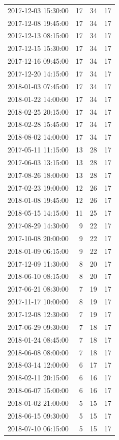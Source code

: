 \begin{tabular}{lrrr}
2017-12-03 15:30:00 & 17 & 34 & 17 \\
2017-12-08 19:45:00 & 17 & 34 & 17 \\
2017-12-13 08:15:00 & 17 & 34 & 17 \\
2017-12-15 15:30:00 & 17 & 34 & 17 \\
2017-12-16 09:45:00 & 17 & 34 & 17 \\
2017-12-20 14:15:00 & 17 & 34 & 17 \\
2018-01-03 07:45:00 & 17 & 34 & 17 \\
2018-01-22 14:00:00 & 17 & 34 & 17 \\
2018-02-25 20:15:00 & 17 & 34 & 17 \\
2018-02-28 15:45:00 & 17 & 34 & 17 \\
2018-08-02 14:00:00 & 17 & 34 & 17 \\
2017-05-11 11:15:00 & 13 & 28 & 17 \\
2017-06-03 13:15:00 & 13 & 28 & 17 \\
2017-08-26 18:00:00 & 13 & 28 & 17 \\
2017-02-23 19:00:00 & 12 & 26 & 17 \\
2018-01-08 19:45:00 & 12 & 26 & 17 \\
2018-05-15 14:15:00 & 11 & 25 & 17 \\
2017-08-29 14:30:00 & 9 & 22 & 17 \\
2017-10-08 20:00:00 & 9 & 22 & 17 \\
2018-01-09 06:15:00 & 9 & 22 & 17 \\
2017-12-09 11:30:00 & 8 & 20 & 17 \\
2018-06-10 08:15:00 & 8 & 20 & 17 \\
2017-06-21 08:30:00 & 7 & 19 & 17 \\
2017-11-17 10:00:00 & 8 & 19 & 17 \\
2017-12-08 12:30:00 & 7 & 19 & 17 \\
2017-06-29 09:30:00 & 7 & 18 & 17 \\
2018-01-24 08:45:00 & 7 & 18 & 17 \\
2018-06-08 08:00:00 & 7 & 18 & 17 \\
2018-03-14 12:00:00 & 6 & 17 & 17 \\
2018-02-11 20:15:00 & 6 & 16 & 17 \\
2018-06-07 15:00:00 & 6 & 16 & 17 \\
2018-01-02 21:00:00 & 5 & 15 & 17 \\
2018-06-15 09:30:00 & 5 & 15 & 17 \\
2018-07-10 06:15:00 & 5 & 15 & 17 \\

\end{tabular}

